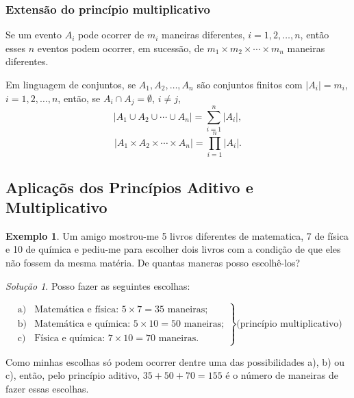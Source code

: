\documentclass[]{book}
\theoremstyle{definition}
\theoremstyle{definition}
\newtheorem{example}{Exemplo}[chapter]
\theoremstyle{definition}
\theoremstyle{remark}
\newtheorem*{solution}{Solução}
\begin{document}
\hypertarget{extensuxe3o-do-princuxedpio-multiplicativo}{%
\subsubsection*{Extensão do princípio multiplicativo}\label{extensuxe3o-do-princuxedpio-multiplicativo}}

Se um evento \(A_i\) pode ocorrer de \(m_i\) maneiras diferentes, \(i = 1,2,\ldots, n\), então esses \(n\) eventos podem ocorrer, em sucessão, de \(m_1 \times m_2 \times \cdots \times m_n\) maneiras diferentes.

Em linguagem de conjuntos, se \(A_1, A_2, \ldots, A_n\) são conjuntos finitos com \(|A_i|=m_i\), \(i = 1,2,\ldots, n\), então, se \(A_i \cap A_j = \emptyset\), \(i \neq j\),
\[ |A_1 \cup A_2 \cup \cdots \cup A_n| =  \sum_{i=1}^{n}|A_i|,\]
\[ |A_1 \times A_2 \times \cdots \times A_n| =  \prod_{i=1}^{n}|A_i|.\]

\hypertarget{aplicauxe7uxf5s-dos-princuxedpios-aditivo-e-multiplicativo}{%
\subsection{Aplicaçõs dos Princípios Aditivo e Multiplicativo}\label{aplicauxe7uxf5s-dos-princuxedpios-aditivo-e-multiplicativo}}

\begin{example}
\protect\hypertarget{exm:unnamed-chunk-44}{}{\label{exm:unnamed-chunk-44} }Um amigo mostrou-me 5 livros diferentes de matematica, 7 de física e 10 de química e pediu-me para escolher dois livros com a condição de que eles não fossem da mesma matéria. De quantas maneras posso escolhê-los?
\end{example}

\begin{solution}
\iffalse{} {Solução. } \fi{}Posso fazer as seguintes escolhas:

\[ \left.\begin{array}{ll}
\text{a)}& \text{Matemática e física: } 5 \times 7 = 35 \text{ maneiras;} \\ 
\text{b)}& \text{Matemática e química: } 5 \times 10 = 50 \text{ maneiras;} \\ 
\text{c)}& \text{Física e química: } 7 \times 10 = 70 \text{ maneiras.}
\end{array}\right\} \text{(princípio multiplicativo)}
\]

Como minhas escolhas só podem ocorrer dentre uma das possibilidades a), b) ou c), então, pelo princípio aditivo, \(35 + 50 + 70 = 155\) é o número de maneiras de fazer essas escolhas.
\end{solution}
\end{document}
